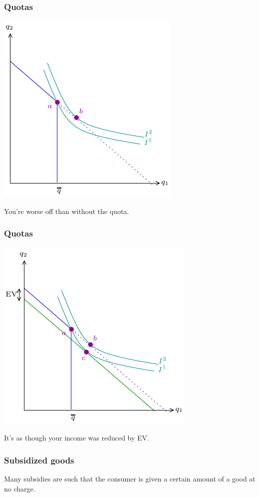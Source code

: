 \documentclass[xcolor=pdftex,dvipsnames]{beamer}
\begin{document}
\begin{frame}
\frametitle{Quotas}
\begin{center}
\includegraphics{pics/Quota5}
\end{center}
You're worse off than without the quota.
\end{frame}


\begin{frame}
\frametitle{Quotas}
\begin{center}
\includegraphics{pics/Quota6}
\end{center}
It's as though your income was reduced by EV.
\end{frame}




\begin{frame}
\frametitle{Subsidized goods}
Many subsidies are such that the consumer is given a certain amount of
a good at no charge. 
\bigskip


\bigskip
{}

\end{frame}
\end{document}
